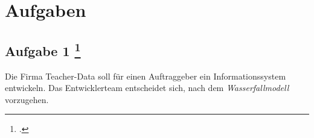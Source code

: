 \documentclass{lehramt-informatik}
\begin{document}

\chapter{Aufgaben}

%

\section{Aufgabe 1
\footcite[Seite 1]{sosy:ab:1}}

Die Firma Teacher-Data soll für einen Auftraggeber ein
Informationssystem entwickeln. Das Entwicklerteam entscheidet sich, nach
dem \emph{Wasserfallmodell} vorzugehen.
\end{document}
